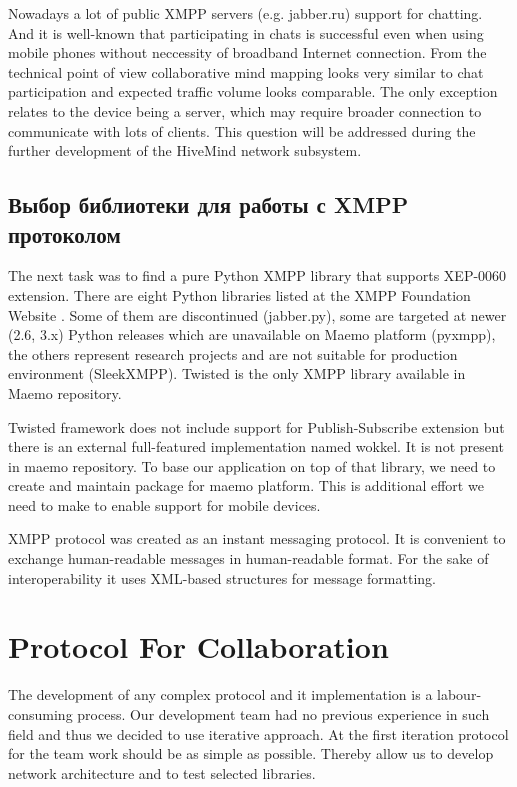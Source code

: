 Nowadays a lot of public XMPP servers (e.g. jabber.ru) support for chatting. And
it is well-known that participating in chats is successful even when using
mobile phones without neccessity of broadband Internet connection. From the
technical point of view collaborative mind mapping looks very similar to chat
participation and expected traffic volume looks comparable. The only exception
relates to the device being a server, which may require broader connection to
communicate with lots of clients. This question will be addressed during the
further development of the HiveMind network subsystem.

\subsection{Выбор библиотеки для работы с XMPP протоколом}
The next task was to find a pure Python XMPP library that supports XEP-0060
extension. There are eight Python libraries listed at the XMPP Foundation
Website \cite{xmpp}. Some of them are discontinued (jabber.py), some are
targeted at newer (2.6, 3.x) Python releases which are unavailable on Maemo
platform (pyxmpp), the others represent research projects and are not suitable
for production environment (SleekXMPP). Twisted is the only XMPP library
available in Maemo repository.

Twisted framework does not include support for Publish-Subscribe extension but
there is an external full-featured implementation named wokkel.
It is not present in maemo repository. To base our application on top of that 
library, we need to create and maintain package for maemo platform. This is
additional effort we need to make to enable support for mobile devices.

XMPP protocol was created as an instant messaging protocol. It is convenient to
exchange human-readable messages in human-readable format. For the sake of 
interoperability it uses XML-based structures for message formatting. 

\section{Protocol For Collaboration}

 The development of any complex protocol and it implementation is a
 labour-consuming process. Our development team had no previous experience in
 such field and thus we decided to use iterative approach. At the first iteration
 protocol for the team work should be as simple as possible. Thereby allow us to
 develop network architecture and to test selected libraries.

